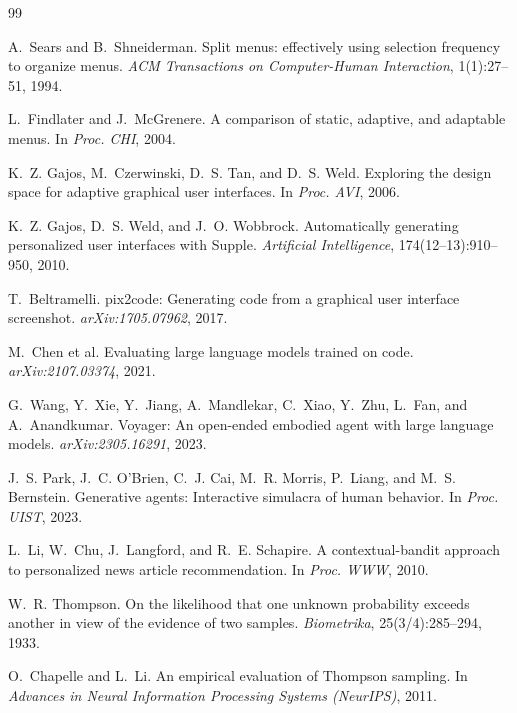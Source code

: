 \documentclass[11pt]{article}
\begin{document}
\begin{thebibliography}{99}
\setlength{\itemsep}{2pt}

A.~Sears and B.~Shneiderman.
\newblock Split menus: effectively using selection frequency to organize menus.
\newblock \emph{ACM Transactions on Computer-Human Interaction}, 1(1):27--51, 1994.

L.~Findlater and J.~McGrenere.
\newblock A comparison of static, adaptive, and adaptable menus.
\newblock In \emph{Proc. CHI}, 2004.

K.~Z. Gajos, M.~Czerwinski, D.~S. Tan, and D.~S. Weld.
\newblock Exploring the design space for adaptive graphical user interfaces.
\newblock In \emph{Proc. AVI}, 2006.

K.~Z. Gajos, D.~S. Weld, and J.~O. Wobbrock.
\newblock Automatically generating personalized user interfaces with Supple.
\newblock \emph{Artificial Intelligence}, 174(12--13):910--950, 2010.

T.~Beltramelli.
\newblock pix2code: Generating code from a graphical user interface screenshot.
\newblock \emph{arXiv:1705.07962}, 2017.

M.~Chen et al.
\newblock Evaluating large language models trained on code.
\newblock \emph{arXiv:2107.03374}, 2021.

G.~Wang, Y.~Xie, Y.~Jiang, A.~Mandlekar, C.~Xiao, Y.~Zhu, L.~Fan, and A.~Anandkumar.
\newblock Voyager: An open-ended embodied agent with large language models.
\newblock \emph{arXiv:2305.16291}, 2023.

J.~S. Park, J.~C. O'Brien, C.~J. Cai, M.~R. Morris, P.~Liang, and M.~S. Bernstein.
\newblock Generative agents: Interactive simulacra of human behavior.
\newblock In \emph{Proc. UIST}, 2023.

L.~Li, W.~Chu, J.~Langford, and R.~E. Schapire.
\newblock A contextual-bandit approach to personalized news article recommendation.
\newblock In \emph{Proc. WWW}, 2010.

W.~R. Thompson.
\newblock On the likelihood that one unknown probability exceeds another in view of the evidence of two samples.
\newblock \emph{Biometrika}, 25(3/4):285--294, 1933.

O.~Chapelle and L.~Li.
\newblock An empirical evaluation of Thompson sampling.
\newblock In \emph{Advances in Neural Information Processing Systems (NeurIPS)}, 2011.


\end{thebibliography}
\end{document}
